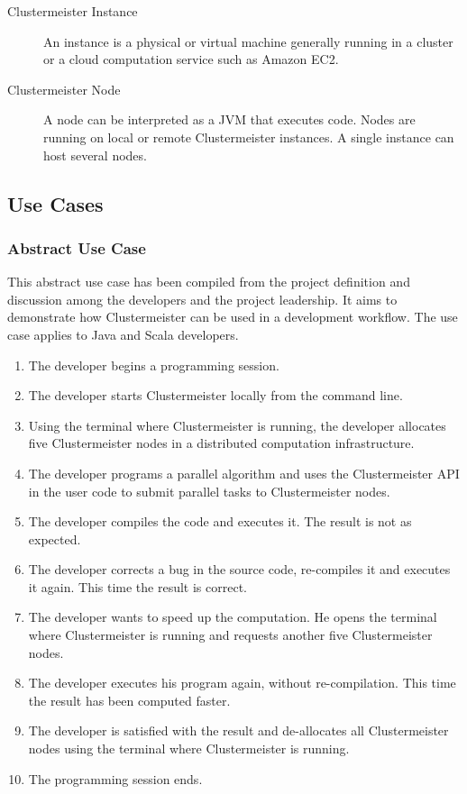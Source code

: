 \documentclass[english]{uzhpub}
\begin{document}
\begin{description}
\item[Clustermeister Instance] An instance is a physical or virtual machine generally running in a cluster or a cloud computation service such as Amazon EC2.
\item[Clustermeister Node] A node can be interpreted as a JVM that executes code. Nodes are running on local or remote Clustermeister instances. A single instance can host several nodes.
\end{description}

\subsection{Use Cases}

\subsubsection*{Abstract Use Case}
This abstract use case has been compiled from the project definition \cite{proj-def} and discussion among the developers and the project leadership. It aims to demonstrate how Clustermeister can be used in a development workflow. The use case applies to Java and Scala developers.

\begin{enumerate}
\item \label{uc:start}The developer begins a programming session.
\item The developer starts Clustermeister locally from the command line.
\item \label{uc:alloc}Using the terminal where Clustermeister is running, the developer allocates five Clustermeister nodes in a distributed computation infrastructure.
\item \label{uc:prog}The developer programs a parallel algorithm and uses the Clustermeister API in the user code to submit parallel tasks to Clustermeister nodes.
\item The developer compiles the code and executes it. The result is not as expected.
\item The developer corrects a bug in the source code, re-compiles it and executes it again. This time the result is correct.
\item The developer wants to speed up the computation. He opens the terminal where Clustermeister is running and requests another five Clustermeister nodes.
\item The developer executes his program again, without re-compilation. This time the result has been computed faster.
\item The developer is satisfied with the result and de-allocates all Clustermeister nodes using the terminal where Clustermeister is running.
\item The programming session ends.
\end{enumerate}
\end{document}
